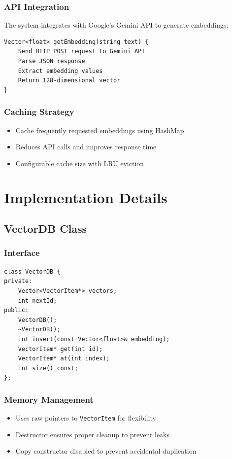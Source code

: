 \documentclass[12pt,a4paper]{article}
\begin{document}
\subsubsection{API Integration}
The system integrates with Google's Gemini API to generate embeddings:

\begin{lstlisting}
Vector<float> getEmbedding(string text) {
    Send HTTP POST request to Gemini API
    Parse JSON response
    Extract embedding values
    Return 128-dimensional vector
}
\end{lstlisting}

\subsubsection{Caching Strategy}
\begin{itemize}
    \item Cache frequently requested embeddings using HashMap
    \item Reduces API calls and improves response time
    \item Configurable cache size with LRU eviction
\end{itemize}

\section{Implementation Details}

\subsection{VectorDB Class}

\subsubsection{Interface}
\begin{lstlisting}
class VectorDB {
private:
    Vector<VectorItem*> vectors;
    int nextId;
public:
    VectorDB();
    ~VectorDB();
    int insert(const Vector<float>& embedding);
    VectorItem* get(int id);
    VectorItem* at(int index);
    int size() const;
};
\end{lstlisting}

\subsubsection{Memory Management}
\begin{itemize}
    \item Uses raw pointers to \texttt{VectorItem} for flexibility
    \item Destructor ensures proper cleanup to prevent leaks
    \item Copy constructor disabled to prevent accidental duplication
\end{itemize}
\end{document}
